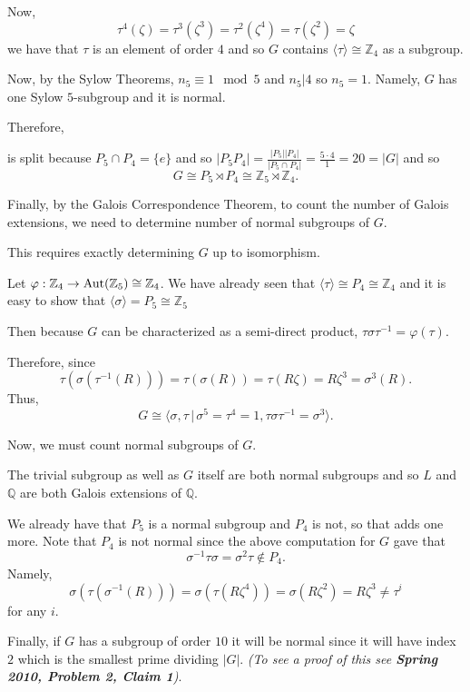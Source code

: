 \documentclass[12pt]{Qual}
\begin{document}
\begin{solution}
Now, $$\tau^4(\zeta)=\tau^3(\zeta^3)=\tau^2(\zeta^4)=\tau(\zeta^2)=\zeta$$ we have that $\tau$ is an element of order $4$ and so $G$ contains $\langle\tau\rangle\cong\mathbb{Z}_4$ as a subgroup.

Now, by the Sylow Theorems, $n_5\equiv 1\mod 5$ and $n_5|4$ so $n_5=1$. Namely, $G$ has one Sylow $5$-subgroup and it is normal.

Therefore, \begin{center}
\end{center}
is split because $P_5\cap P_4=\{e\}$ and so $|P_5P_4|=\frac{|P_5||P_4|}{|P_5\cap P_4|}=\frac{5\cdot 4}{1}=20=|G|$ and so $$G\cong P_5\rtimes P_4\cong\mathbb{Z}_5\rtimes\mathbb{Z}_4.$$

Finally, by the Galois Correspondence Theorem, to count the number of Galois extensions, we need to determine number of normal subgroups of $G$.

This requires exactly determining $G$ up to isomorphism.

Let $\varphi:\mathbb{Z}_4\to\text{Aut}(\mathbb{Z}_5)\cong\mathbb{Z}_4$. We have already seen that $\langle \tau\rangle\cong P_4\cong\mathbb{Z}_4$ and it is easy to show that $\langle \sigma\rangle=P_5\cong\mathbb{Z}_5$

Then because $G$ can be characterized as a semi-direct product, $\tau\sigma\tau^{-1}=\varphi(\tau).$

Therefore, since $$\tau(\sigma(\tau^{-1}(R)))=\tau(\sigma(R))=\tau(R\zeta)=R\zeta^3=\sigma^3(R).$$ Thus, $$G\cong\langle\sigma,\tau\,|\,\sigma^5=\tau^4=1,\tau\sigma\tau^{-1}=\sigma^3\rangle.$$

Now, we must count normal subgroups of $G.$

The trivial subgroup as well as $G$ itself are both normal subgroups and so $L$ and $\mathbb{Q}$ are both Galois extensions of $\mathbb{Q}$.

We already have that $P_5$ is a normal subgroup and $P_4$ is not, so that adds one more. Note that $P_4$ is not normal since the above computation for $G$ gave that $$\sigma^{-1}\tau\sigma=\sigma^2\tau\notin P_4.$$ Namely, $$\sigma(\tau(\sigma^{-1}(R)))=\sigma(\tau(R\zeta^4))=\sigma(R\zeta^2)=R\zeta^3\not=\tau^i$$ for any $i$.

Finally, if $G$ has a subgroup of order $10$ it will be normal since it will have index $2$ which is the smallest prime dividing $|G|.$ \textit{(To see a proof of this see \textbf{Spring 2010, Problem 2, Claim 1})}.


\end{solution}
\end{document}
